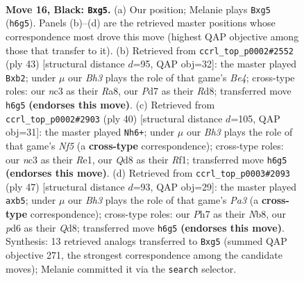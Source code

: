 \documentclass[11pt]{article}
\begin{document}
\clearpage

\begin{figure}[p]\centering
\begin{subfigure}{0.46\textwidth}\centering
\resizebox{\linewidth}{!}{%
\newchessgame
\chessboard[
  setfen={r2q3r/3p1k1p/n2P1p1b/2p3P1/P3P1P1/2N5/1P6/R2QK1NR b KQ - 0 16},
  showmover=false,
  pgfstyle=straightmove, color=movearrow, markmove={h6-g5}
]}
\caption{}
\end{subfigure}\hfill
\begin{subfigure}{0.46\textwidth}\centering
\resizebox{\linewidth}{!}{%
\newchessgame
\chessboard[
  setfen={r2r2k1/4qp1p/p5p1/1pR1b3/4P3/5N1P/PPQ2PP1/R5K1 b - - 2 22},
  showmover=false,
  pgfstyle=straightmove, color=movearrow, markmove={e5-b2}
]}
\caption{}
\end{subfigure}
\\[4pt]
\begin{subfigure}{0.46\textwidth}\centering
\resizebox{\linewidth}{!}{%
\newchessgame
\chessboard[
  setfen={r2q2k1/1pr2p1p/p4np1/5N2/8/3P2Q1/PP4PP/4RRK1 w - - 2 21},
  showmover=false,
  pgfstyle=straightmove, color=movearrow, markmove={f5-h6}
]}
\caption{}
\end{subfigure}\hfill
\begin{subfigure}{0.46\textwidth}\centering
\resizebox{\linewidth}{!}{%
\newchessgame
\chessboard[
  setfen={1n1qr1k1/5pb1/pr4pp/1Pp1P3/8/5N1P/1PB2PP1/RQ2R1K1 b - - 0 24},
  showmover=false,
  pgfstyle=straightmove, color=movearrow, markmove={a6-b5}
]}
\caption{}
\end{subfigure}
\caption{\textbf{Move 16, Black: \texttt{Bxg5}.} (a) Our position; Melanie plays \texttt{Bxg5} (\texttt{h6g5}). Panels (b)--(d) are the retrieved master positions whose correspondence most drove this move (highest QAP objective among those that transfer to it). (b) Retrieved from \texttt{ccrl\_top\_p0002\#2552} (ply 43) [structural distance $d$=95, QAP obj=32]: the master played \texttt{Bxb2}; under $\mu$ our \emph{Bh3} plays the role of that game's \emph{Be4}; cross-type roles: our \emph{n}c3 as their \emph{R}a8, our \emph{P}d7 as their \emph{R}d8; transferred move \texttt{h6g5} \textbf{(endorses this move)}. (c) Retrieved from \texttt{ccrl\_top\_p0002\#2903} (ply 40) [structural distance $d$=105, QAP obj=31]: the master played \texttt{Nh6+}; under $\mu$ our \emph{Bh3} plays the role of that game's \emph{Nf5} (a \textbf{cross-type} correspondence); cross-type roles: our \emph{n}c3 as their \emph{R}e1, our \emph{Q}d8 as their \emph{R}f1; transferred move \texttt{h6g5} \textbf{(endorses this move)}. (d) Retrieved from \texttt{ccrl\_top\_p0003\#2093} (ply 47) [structural distance $d$=93, QAP obj=29]: the master played \texttt{axb5}; under $\mu$ our \emph{Bh3} plays the role of that game's \emph{Pa3} (a \textbf{cross-type} correspondence); cross-type roles: our \emph{P}h7 as their \emph{N}b8, our \emph{p}d6 as their \emph{Q}d8; transferred move \texttt{h6g5} \textbf{(endorses this move)}. Synthesis: 13 retrieved analogs transferred to \texttt{Bxg5} (summed QAP objective 271, the strongest correspondence among the candidate moves); Melanie committed it via the \texttt{search} selector.}
\label{fig:thought-m31}
\end{figure}
\end{document}
